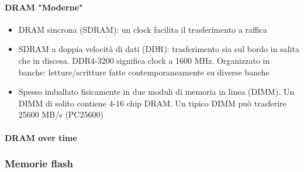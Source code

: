 \documentclass[12pt,a4paper]{article}
\begin{document}
\paragraph{DRAM "Moderne"}
\begin{itemize}
\item DRAM sincrona (SDRAM): un clock facilita il trasferimento a raffica
\item SDRAM a doppia velocità di dati (DDR): trasferimento sia sul bordo in salita che in discesa. DDR4-3200 significa clock a 1600 MHz. Organizzato in banche: letture/scritture fatte contemporaneamente su diverse banche
\item Spesso imballato fisicamente in due moduli di memoria in linea (DIMM). Un DIMM di solito contiene 4-16 chip DRAM. Un tipico DIMM può trasferire 25600 MB/s (PC25600)
\end{itemize}
\paragraph{DRAM over time}
\begin{center}
\end{center}

\subsubsection{Memorie flash}
\end{document}
